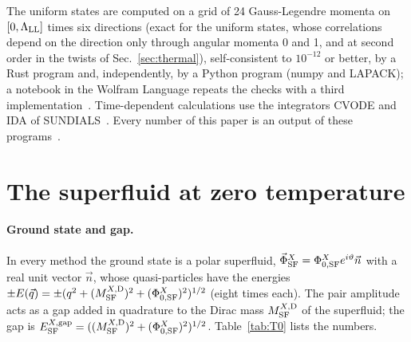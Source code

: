 \documentclass[aps,prd,twocolumn,superscriptaddress,nofootinbib,floatfix,longbibliography]{revtex4-2}
\newcommand{\LL}{{\rm LL}}
\newcommand{\SF}{{\rm SF}}
\begin{document}
The uniform states are computed on a grid of 24 Gauss-Legendre momenta on $[0,\Lambda_\LL]$ times six directions (exact
for the uniform states, whose correlations depend on the direction only through angular momenta 0 and 1, and at second
order in the twists of Sec.~\ref{sec:thermal}),
self-consistent to $10^{-12}$ or better, by a Rust program and, independently, by a Python program (numpy and LAPACK); a
notebook in the Wolfram Language repeats the checks with a third implementation~\cite{SM}. Time-dependent calculations use the
integrators CVODE and IDA of SUNDIALS~\cite{SUNDIALS2005,SUNDIALS2022}. Every number of this paper is an output of these
programs~\cite{SM,Repo}.

\section{The superfluid at zero temperature}
\label{sec:T0}

\paragraph*{Ground state and gap.}
In every method the ground state is a polar superfluid, $\vec\Phi^X_\SF=\Phi^X_{0,\SF}e^{i\vartheta}\vec n$ with a real unit
vector $\vec n$, whose quasi-particles have the energies $\pm E(\vec q)=\pm(q^2+(M^{X,{\rm D}}_\SF)^2+(\Phi^X_{0,\SF})^2)^{1/2}$
(eight times each). The pair amplitude acts as a gap added in quadrature to the Dirac mass $M^{X,{\rm D}}_\SF$ of the
superfluid; the gap is $E^{X,{\rm gap}}_\SF=((M^{X,{\rm D}}_\SF)^2+(\Phi^X_{0,\SF})^2)^{1/2}$. Table~\ref{tab:T0} lists the
numbers.
\end{document}
